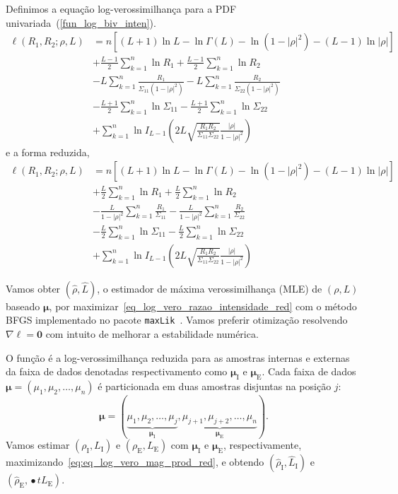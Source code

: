 Definimos a equação log-verossimilhança para a PDF univariada~(\ref{fun_log_biv_inten}).
\begin{equation}\nonumber
\begin{split} 
  \ell(R_1, R_2;\rho, L)&=n\left[(L+1)\ln L - \ln\Gamma(L)- \ln(1-|\rho|^2)-(L-1)\ln|\rho|\right] \\
                        &+\frac{L-1}{2}\sum_{k=1}^{n} \ln R_1 +\frac{L-1}{2} \sum_{k=1}^{n}\ln R_2\\
                        &-L\sum_{k=1}^{n}\frac{R_1}{\Sigma_{11}(1-|\rho|^2)}-L\sum_{k=1}^{n}\frac{R_2}{\Sigma_{22}(1-|\rho|^2)}\\
	&-\frac{L+1}{2}\sum_{k=1}^{n}\ln\Sigma_{11}-\frac{L+1}{2}\sum_{k=1}^{n}\ln\Sigma_{22} \\
	&+\sum_{k=1}^{n}\ln I_{L-1}\left(2L\sqrt{\frac{R_1R_2}{\Sigma_{11}\Sigma_{22}}}\frac{|\rho|}{1-|\rho|^2}\right)
\end{split}
\end{equation} 
e a forma reduzida,
\begin{equation}\label{eq_log_vero_biv_prod_red}
\begin{split}
\ell(R_1, R_2;\rho, L)&=n\left[(L+1)\ln L - \ln\Gamma(L)- \ln(1-|\rho|^2)-(L-1)\ln|\rho|\right] \\
                        &+\frac{L}{2}\sum_{k=1}^{n} \ln R_1 +\frac{L}{2} \sum_{k=1}^{n}\ln R_2\\
                        &-\frac{L}{1-|\rho|^2}\sum_{k=1}^{n}\frac{R_1}{\Sigma_{11}}-\frac{L}{1-|\rho|^2}\sum_{k=1}^{n}\frac{R_2}{\Sigma_{22}}\\
	&-\frac{L}{2}\sum_{k=1}^{n}\ln\Sigma_{11}-\frac{L}{2}\sum_{k=1}^{n}\ln\Sigma_{22} \\
	&+\sum_{k=1}^{n}\ln I_{L-1}\left(2L\sqrt{\frac{R_1R_2}{\Sigma_{11}\Sigma_{22}}}\frac{|\rho|}{1-|\rho|^2}\right)
\end{split}
 \end{equation} 

Vamos obter $(\widehat \rho, \widehat L)$, o estimador de máxima verossimilhança (MLE) de $(\rho, L)$ baseado $\bm \mu$, por maximizar~\eqref{eq_log_vero_razao_intensidade_red} com o método BFGS implementado no pacote \texttt{maxLik}~\citep{ht}. Vamos preferir otimização resolvendo $\nabla\ell=\bm 0$ com intuito de melhorar a estabilidade numérica.

O função é a log-verossimilhança reduzida para as amostras internas e externas da faixa de dados denotadas respectivamento como $\bm \mu_\text{I}$ e $\bm \mu_\text{E}$. Cada faixa de dados $\bm \mu = (\mu_1,\mu_2,\dots,\mu_n)$ é particionada em duas amostras disjuntas na posição $j$:  
$$
\bm \mu = (\underbrace{\mu_1,\mu_2,\dots,\mu_j}_{\bm \mu_\text{I}}, 
\underbrace{\mu_{j+1}, \mu_{j+2},\dots,\mu_n}_{\bm \mu_\text{E}}).
$$
Vamos estimar $(\rho_\text{I},L_\text{I})$ e $(\rho_\text{E},L_\text{E})$ com $\bm \mu_\text{I}$ e $\bm \mu_\text{E}$, respectivamente, maximizando~\eqref{eq:eq_log_vero_mag_prod_red}, e obtendo $(\widehat{\rho}_\text{I}, \widehat{L}_\text{I})$ e $(\widehat{\rho}_\text{E}, \widehat{•}t{L}_\text{E})$.

